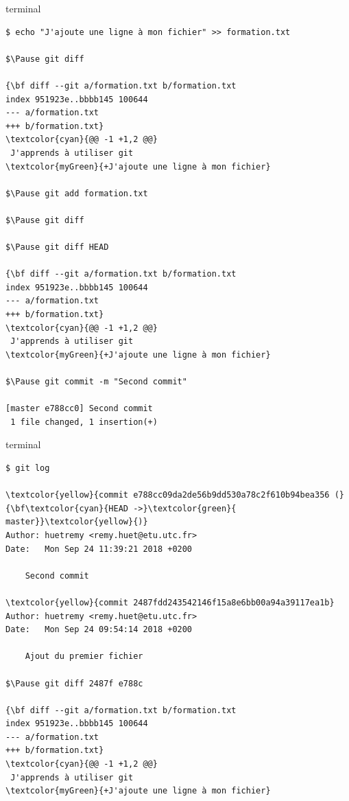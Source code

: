 \documentclass[usepdftitle=false]{beamer}
\def\seplength{.3\topsep}
\newcommand{\Pause}{%
\ifdef{\Release}
  {\pause}
  {}
}
\begin{document}
\begin{frame}[fragile]
	\begin{beamercolorbox}[rounded=true,shadow=true]{terminal}
\vspace{-\seplength}
\begin{Verbatim}
$ echo "J'ajoute une ligne à mon fichier" >> formation.txt

$\Pause git diff

{\bf diff --git a/formation.txt b/formation.txt
index 951923e..bbbb145 100644
--- a/formation.txt
+++ b/formation.txt}
\textcolor{cyan}{@@ -1 +1,2 @@}
 J'apprends à utiliser git
\textcolor{myGreen}{+J'ajoute une ligne à mon fichier}

$\Pause git add formation.txt

$\Pause git diff

$\Pause git diff HEAD

{\bf diff --git a/formation.txt b/formation.txt
index 951923e..bbbb145 100644
--- a/formation.txt
+++ b/formation.txt}
\textcolor{cyan}{@@ -1 +1,2 @@}
 J'apprends à utiliser git
\textcolor{myGreen}{+J'ajoute une ligne à mon fichier}

$\Pause git commit -m "Second commit"

[master e788cc0] Second commit
 1 file changed, 1 insertion(+)

\end{Verbatim}
	\end{beamercolorbox}
\end{frame}

\begin{frame}[fragile]
	\begin{beamercolorbox}[rounded=true,shadow=true]{terminal}
\vspace{-\seplength}
		\begin{Verbatim}
$ git log

\textcolor{yellow}{commit e788cc09da2de56b9dd530a78c2f610b94bea356 (}{\bf\textcolor{cyan}{HEAD ->}\textcolor{green}{ master}}\textcolor{yellow}{)}
Author: huetremy <remy.huet@etu.utc.fr>
Date:   Mon Sep 24 11:39:21 2018 +0200

    Second commit

\textcolor{yellow}{commit 2487fdd243542146f15a8e6bb00a94a39117ea1b}
Author: huetremy <remy.huet@etu.utc.fr>
Date:   Mon Sep 24 09:54:14 2018 +0200

    Ajout du premier fichier

$\Pause git diff 2487f e788c

{\bf diff --git a/formation.txt b/formation.txt
index 951923e..bbbb145 100644
--- a/formation.txt
+++ b/formation.txt}
\textcolor{cyan}{@@ -1 +1,2 @@}
 J'apprends à utiliser git
\textcolor{myGreen}{+J'ajoute une ligne à mon fichier}

		\end{Verbatim}
	\end{beamercolorbox}
\end{frame}
\end{document}
